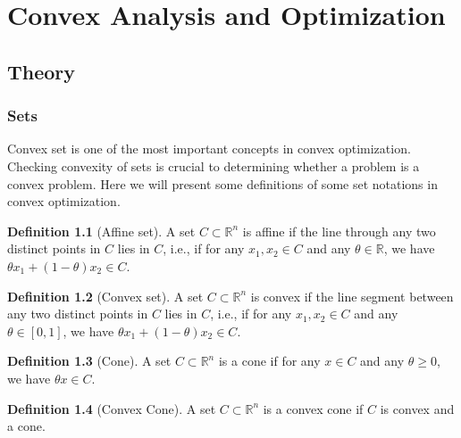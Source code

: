 \documentclass[
]{book}
\theoremstyle{definition}
\newtheorem{definition}{Definition}[chapter]
\theoremstyle{definition}
\theoremstyle{definition}
\theoremstyle{definition}
\theoremstyle{remark}
\begin{document}
\appendix


\chapter{Convex Analysis and Optimization}\label{appconvex}

\section{Theory}\label{appconvex-theory}

\subsection{Sets}\label{sets}

Convex set is one of the most important concepts in convex optimization. Checking convexity of sets is crucial to determining whether a problem is a convex problem. Here we will present some definitions of some set notations in convex optimization.

\begin{definition}[Affine set]
\protect\hypertarget{def:affineset}{}\label{def:affineset}A set \(C\subset \mathbb{R}^n\) is affine if the line through any two distinct points in \(C\) lies in \(C\), i.e., if for any \(x_1,x_2 \in C\) and any \(\theta \in \mathbb{R}\), we have \(\theta x_1 + (1-\theta)x_2 \in C\).
\end{definition}

\begin{definition}[Convex set]
\protect\hypertarget{def:convexset}{}\label{def:convexset}A set \(C\subset \mathbb{R}^n\) is convex if the line segment between any two distinct points in \(C\) lies in \(C\), i.e., if for any \(x_1,x_2 \in C\) and any \(\theta \in [0,1]\), we have \(\theta x_1 + (1-\theta)x_2 \in C\).
\end{definition}

\begin{definition}[Cone]
\protect\hypertarget{def:cone}{}\label{def:cone}A set \(C\subset \mathbb{R}^n\) is a cone if for any \(x\in C\) and any \(\theta\geq 0\), we have \(\theta x \in C\).
\end{definition}

\begin{definition}[Convex Cone]
\protect\hypertarget{def:convexcone}{}\label{def:convexcone}A set \(C\subset \mathbb{R}^n\) is a convex cone if \(C\) is convex and a cone.
\end{definition}
\end{document}
